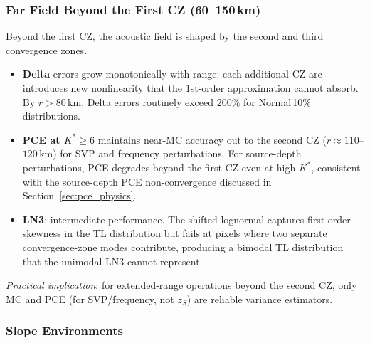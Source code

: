\documentclass[11pt,a4paper]{article}
\begin{document}
\subsubsection{Far Field Beyond the First CZ (60--150\,km)}

Beyond the first CZ, the acoustic field is shaped by the second and third convergence zones.
\begin{itemize}
  \item \textbf{Delta} errors grow monotonically with range: each additional CZ arc introduces
        new nonlinearity that the 1st-order approximation cannot absorb.
        By $r > 80$\,km, Delta errors routinely exceed $200\%$ for Normal\,10\% distributions.
  \item \textbf{PCE at $K^* \geq 6$} maintains near-MC accuracy out to the second CZ
        ($r \approx 110$--$120$\,km) for SVP and frequency perturbations.
        For source-depth perturbations, PCE degrades beyond the first CZ even at high $K^*$,
        consistent with the source-depth PCE non-convergence discussed in
        Section~\ref{sec:pce_physics}.
  \item \textbf{LN3}: intermediate performance.
        The shifted-lognormal captures first-order skewness in the TL distribution but fails
        at pixels where two separate convergence-zone modes contribute, producing a bimodal
        TL distribution that the unimodal LN3 cannot represent.
\end{itemize}
\emph{Practical implication}: for extended-range operations beyond the second CZ, only MC
and PCE (for SVP/frequency, not $z_S$) are reliable variance estimators.

\subsubsection{Slope Environments}
\end{document}

